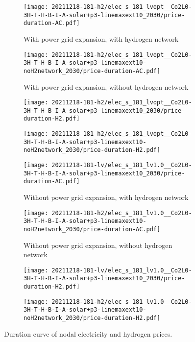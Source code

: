 \begin{figure}
    \begin{subfigure}{0.49\textwidth}
        \centering
        \caption{With power grid expansion, with hydrogen network}
        \texttt{[image: 20211218-181-h2/elec\_s\_181\_lvopt\_\_Co2L0-3H-T-H-B-I-A-solar+p3-linemaxext10\_2030/price-duration-AC.pdf]}
    \end{subfigure}
    \begin{subfigure}{0.49\textwidth}
        \centering
        \caption{With power grid expansion, without hydrogen network}
        \texttt{[image: 20211218-181-h2/elec\_s\_181\_lvopt\_\_Co2L0-3H-T-H-B-I-A-solar+p3-linemaxext10-noH2network\_2030/price-duration-AC.pdf]}
    \end{subfigure}
    \begin{subfigure}{0.49\textwidth}
        \centering
        \texttt{[image: 20211218-181-h2/elec\_s\_181\_lvopt\_\_Co2L0-3H-T-H-B-I-A-solar+p3-linemaxext10\_2030/price-duration-H2.pdf]}
    \end{subfigure}
    \begin{subfigure}{0.49\textwidth}
        \centering
        \texttt{[image: 20211218-181-h2/elec\_s\_181\_lvopt\_\_Co2L0-3H-T-H-B-I-A-solar+p3-linemaxext10-noH2network\_2030/price-duration-H2.pdf]}
    \end{subfigure}
    \begin{subfigure}{0.49\textwidth}
        \centering
        \caption{Without power grid expansion, with hydrogen network}
        \texttt{[image: 20211218-181-lv/elec\_s\_181\_lv1.0\_\_Co2L0-3H-T-H-B-I-A-solar+p3-linemaxext10\_2030/price-duration-AC.pdf]}
    \end{subfigure}
    \begin{subfigure}{0.49\textwidth}
        \centering
        \caption{Without power grid expansion, without hydrogen network}
        \texttt{[image: 20211218-181-h2/elec\_s\_181\_lv1.0\_\_Co2L0-3H-T-H-B-I-A-solar+p3-linemaxext10-noH2network\_2030/price-duration-AC.pdf]}
    \end{subfigure}
    \begin{subfigure}{0.49\textwidth}
        \centering
        \texttt{[image: 20211218-181-lv/elec\_s\_181\_lv1.0\_\_Co2L0-3H-T-H-B-I-A-solar+p3-linemaxext10\_2030/price-duration-H2.pdf]}
    \end{subfigure}
    \begin{subfigure}{0.49\textwidth}
        \centering
        \texttt{[image: 20211218-181-h2/elec\_s\_181\_lv1.0\_\_Co2L0-3H-T-H-B-I-A-solar+p3-linemaxext10-noH2network\_2030/price-duration-H2.pdf]}
    \end{subfigure}
    \caption{Duration curve of nodal electricity and hydrogen prices.}
    \label{fig:si:lmp-dc}
\end{figure}

